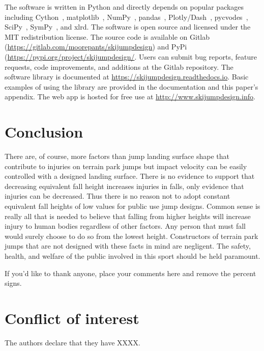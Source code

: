 \documentclass[smallextended]{svjour3}       %
\begin{document}
The software is written in Python and directly depends on popular packages
including Cython~\cite{Behnel2011}, matplotlib~\cite{Hunter2007},
NumPy~\cite{Oliphant2006}, pandas~\cite{McKinney2020},
Plotly/Dash~\cite{Plotly2015}, pycvodes~\cite{Dahlgren2018},
SciPy~\cite{Virtanen2020}, SymPy~\cite{Meurer2017}, and xlrd. The software is
open source and licensed under the MIT redistribution license. The source code
is available on Gitlab (\url{https://gitlab.com/moorepants/skijumpdesign}) and
PyPi (\url{https://pypi.org/project/skijumpdesign/}. Users can submit bug
reports, feature requests, code improvements, and additions at the Gitlab
repository. The software library is documented at
\url{https://skijumpdesign.readthedocs.io}. Basic examples of using the library
are provided in the documentation and this paper's appendix. The web app is
hosted for free use at \url{http://www.skijumpdesign.info}.

\section{Conclusion}
\label{sec:conc}
%
There are, of course, more factors than jump landing surface shape that
contribute to injuries on terrain park jumps but impact velocity can be easily
controlled with a designed landing surface. There is no evidence to support
that decreasing equivalent fall height increases injuries in falls, only
evidence that injuries can be decreased. Thus there is no reason not to adopt
constant equivalent fall heights of low values for public use jump designs.
Common sense is really all that is needed to believe that falling from higher
heights will increase injury to human bodies regardless of other factors. Any
person that must fall would surely choose to do so from the lowest height.
Constructors of terrain park jumps that are not designed with these facts in
mind are negligent. The safety, health, and welfare of the public involved in
this sport should be held paramount.

\begin{acknowledgements}
If you'd like to thank anyone, place your comments here
and remove the percent signs.
\end{acknowledgements}


%
\section*{Conflict of interest}
\label{sec:conflict}
%
The authors declare that they have XXXX.
\end{document}
